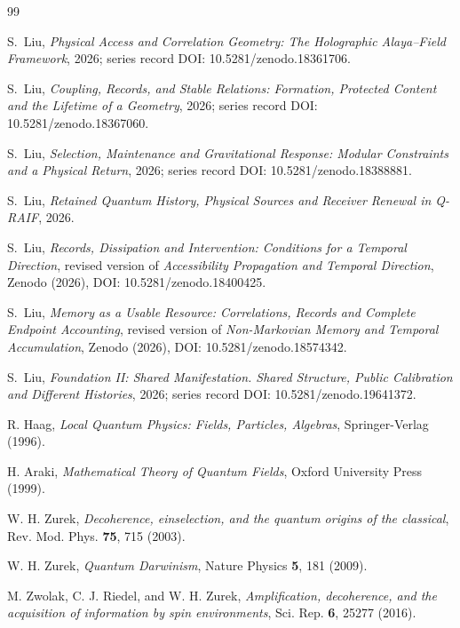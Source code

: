 \documentclass[12pt,a4paper]{article}
\begin{document}
\begin{thebibliography}{99}
\small

S.~Liu, \emph{Physical Access and Correlation Geometry: The Holographic Alaya--Field Framework}, 2026; series record DOI: 10.5281/zenodo.18361706.

S.~Liu, \emph{Coupling, Records, and Stable Relations: Formation, Protected Content and the Lifetime of a Geometry}, 2026; series record DOI: 10.5281/zenodo.18367060.

S.~Liu, \emph{Selection, Maintenance and Gravitational Response: Modular Constraints and a Physical Return}, 2026; series record DOI: 10.5281/zenodo.18388881.

S.~Liu, \emph{Retained Quantum History, Physical Sources and Receiver Renewal in Q-RAIF}, 2026.

S.~Liu, \emph{Records, Dissipation and Intervention: Conditions for a Temporal Direction}, revised version of \emph{Accessibility Propagation and Temporal Direction}, Zenodo (2026), DOI: 10.5281/zenodo.18400425.

S.~Liu, \emph{Memory as a Usable Resource: Correlations, Records and Complete Endpoint Accounting}, revised version of \emph{Non-Markovian Memory and Temporal Accumulation}, Zenodo (2026), DOI: 10.5281/zenodo.18574342.

S.~Liu, \emph{Foundation II: Shared Manifestation. Shared Structure, Public Calibration and Different Histories}, 2026; series record DOI: 10.5281/zenodo.19641372.

R. Haag, \emph{Local Quantum Physics: Fields, Particles, Algebras}, Springer-Verlag (1996).

H. Araki, \emph{Mathematical Theory of Quantum Fields}, Oxford University Press (1999).

W. H. Zurek, \emph{Decoherence, einselection, and the quantum origins of the classical}, Rev. Mod. Phys. \textbf{75}, 715 (2003).

W. H. Zurek, \emph{Quantum Darwinism}, Nature Physics \textbf{5}, 181 (2009).

M. Zwolak, C. J. Riedel, and W. H. Zurek, \emph{Amplification, decoherence, and the acquisition of information by spin environments}, Sci. Rep. \textbf{6}, 25277 (2016).


\end{thebibliography}
\end{document}

